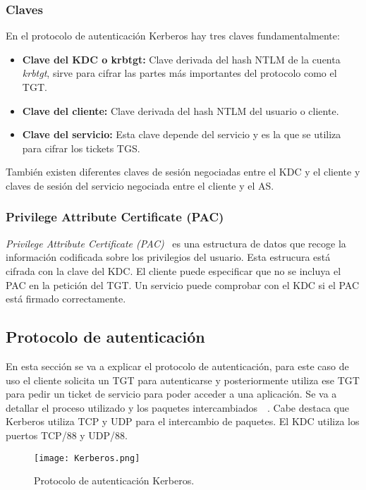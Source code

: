 \subsubsection{Claves}

En el protocolo de au\-ten\-ti\-ca\-ción Kerberos hay tres claves fundamentalmente: 
\begin{itemize}
\item \textbf{Clave del KDC o krbtgt:} Clave derivada del hash NTLM de la cuenta {\it krbtgt}, sirve para cifrar las partes más importantes del protocolo como el TGT.
\item \textbf{Clave del cliente: } Clave derivada del hash NTLM del usuario o cliente. 
\item \textbf{Clave del servicio: } Esta clave depende del servicio y es la que se utiliza para cifrar los tickets TGS. 
\end{itemize}

También existen diferentes claves de sesión negociadas entre el KDC y el cliente y claves de sesión del servicio negociada entre el cliente y el AS. 

\subsubsection{Privilege Attribute Certificate (PAC)}

{\it Privilege Attribute Certificate (PAC)}~\cite{Capitulo3:PAC} es una estructura de datos que recoge la información codificada sobre los privilegios del usuario. Esta estrucura está cifrada con la clave del KDC. El cliente puede especificar que no se incluya el PAC en la petición del TGT. Un servicio puede comprobar con el KDC si el PAC está firmado correctamente. 

\subsection{Protocolo de au\-ten\-ti\-ca\-ción}

En esta sección se va a explicar el protocolo de au\-ten\-ti\-ca\-ción, para este caso de uso el cliente solicita un TGT para autenticarse y posteriormente utiliza ese TGT para pedir un ticket de servicio para poder acceder a una aplicación. Se va a detallar el proceso utilizado y los paquetes intercambiados~\cite{Capitulo3:Kerberos5}~\cite{Capitulo3:Kerberos6}. Cabe destaca que Kerberos utiliza  TCP y UDP para el intercambio de paquetes. El KDC utiliza los puertos TCP/88 y UDP/88.   

\begin{figure}[t!] %
\begin{center}
\texttt{[image: Kerberos.png]}
\end{center}
\caption{Protocolo de au\-ten\-ti\-ca\-ción Kerberos.}
\label{Kerberos}
\end{figure}

